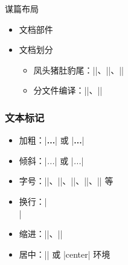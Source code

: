   \begin{frame}[fragile]{谋篇布局}
  \begin{itemize}
    \item 文档部件
  
  
    \item 文档划分
  
      \begin{itemize}
        \item 凤头猪肚豹尾：|\frontmatter|、|\mainmatter|、|\backmatter|
        \item 分文件编译：||、||
      \end{itemize}
  \end{itemize}
  \end{frame}

  \begin{frame}[fragile]
    \frametitle{文本标记}
    \begin{itemize}
      \item 加粗：|{\bfseries ...}| 或 |\textbf{...}|
      \item 倾斜：|{\itshape ...}| 或 |\textit{...}|
      \item 字号：|\tiny|、|\small|、|\normalsize|、|\large|、|\huge| 等
      \item 换行：|\\|
      \item 缩进：|\indent|、|\noindent|
      \item 居中：|\centering| 或 |center| 环境
    \end{itemize}
  \end{frame}
    

